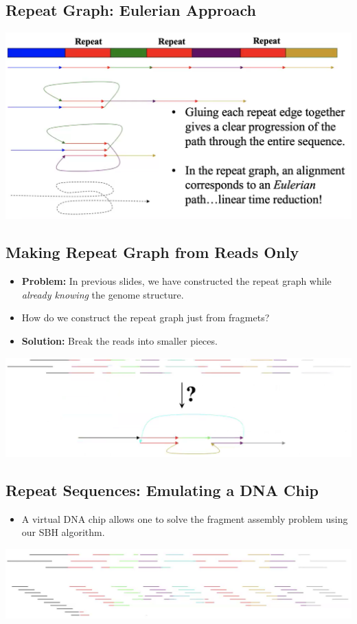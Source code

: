\documentclass[10pt]{article}
\begin{document}
\subsection*{Repeat Graph: Eulerian Approach}
\begin{center}
    \includegraphics*[width=\textwidth]{W4_16.png}
\end{center}

\subsection*{Making Repeat Graph from Reads Only}
\begin{itemize}
    \item \textbf{Problem:} In previous slides, we have constructed the repeat graph while \textit{already knowing} the genome structure.
    \item How do we construct the repeat graph just from fragmets?
    \item \textbf{Solution:} Break the reads into smaller pieces.
\end{itemize}
\begin{center}
    \includegraphics*[width=\textwidth]{W4_17.png}
\end{center}

\subsection*{Repeat Sequences: Emulating a DNA Chip}
\begin{itemize}
    \item A virtual DNA chip allows one to solve the fragment assembly problem using our SBH algorithm.
\end{itemize}
\begin{center}
    \includegraphics*[width=\textwidth]{W4_18.png}
\end{center}
\end{document}
